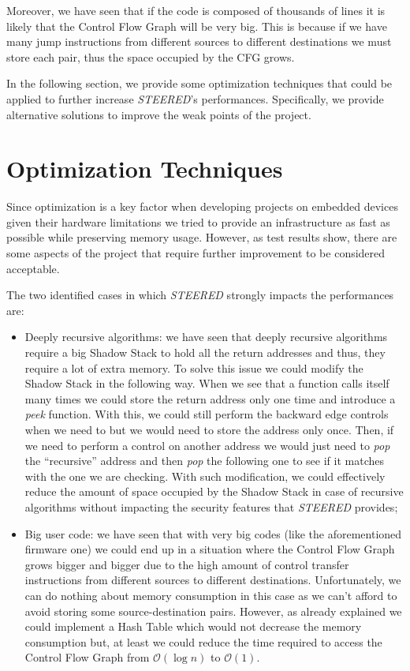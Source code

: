 Moreover, we have seen that if the code is composed of thousands of lines it is
likely that the Control Flow Graph will be very big. This is because if we have many
jump instructions from different sources to different destinations we must store
each pair, thus the space occupied by the CFG grows.

In the following section, we provide some optimization techniques that could be applied
to further increase \textit{STEERED}'s performances. Specifically, we provide
alternative solutions to improve the weak points of the project.

\section{Optimization Techniques}
\label{sec:pa_optimization}

Since optimization is a key factor when developing projects on embedded devices given
their hardware limitations we tried to provide an infrastructure as fast as possible
while preserving memory usage. However, as test results show, there are some
aspects of the project that require further improvement to be considered
acceptable.

The two identified cases in which \textit{STEERED} strongly impacts the performances
are:
\begin{itemize}
  \item Deeply recursive algorithms: we have seen that deeply recursive
    algorithms require a big Shadow Stack to hold all the return addresses and
    thus, they require a lot of extra memory. To solve this issue we could
    modify the Shadow Stack in the following way. When we see that a function calls
    itself many times we could store the return address only one time and introduce
    a \textit{peek} function. With this, we could still perform the backward
    edge controls when we need to but we would need to store the address only
    once. Then, if we need to perform a control on another address we would just
    need to \textit{pop} the ``recursive'' address and then \textit{pop} the
    following one to see if it matches with the one we are checking. With such modification,
    we could effectively reduce the amount of space occupied by the Shadow Stack
    in case of recursive algorithms without impacting the security features that
    \textit{STEERED} provides;

  \item Big user code: we have seen that with very big codes (like the aforementioned
    firmware one) we could end up in a situation where the Control Flow Graph
    grows bigger and bigger due to the high amount of control transfer
    instructions from different sources to different destinations. Unfortunately,
    we can do nothing about memory consumption in this case as we can't afford
    to avoid storing some source-destination pairs. However, as already
    explained we could implement a Hash Table which would not decrease the
    memory consumption but, at least we could reduce the time required to access
    the Control Flow Graph from $\mathcal{O}(\log{n})$ to $\mathcal{O}(1)$.
\end{itemize}

